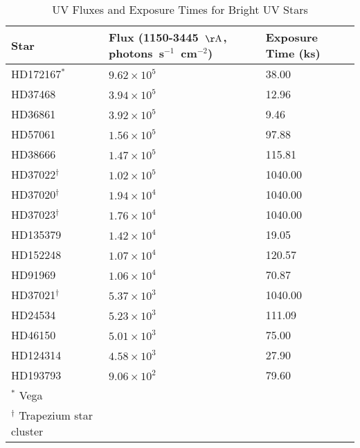 \begin{table*}
\caption{UV Fluxes and Exposure Times for Bright UV Stars\label{tab:star_fluxes}}
\begin{center}
\begin{tabular}{lll}
\hline
\hline
Star & Flux (1150-3445~${\rm \AA}$, photons~s$^{-1}$~cm$^{-2}$) & Exposure Time (ks) \\
\hline
HD172167$^*$ & $9.62 \times 10^5$ & 38.00 \\
HD37468 & $3.94 \times 10^5$ & 12.96 \\
HD36861 & $3.92 \times 10^5$ & 9.46 \\
HD57061 & $1.56 \times 10^5$ & 97.88 \\
HD38666 & $1.47 \times 10^5$ & 115.81 \\
HD37022$^\dagger$ & $1.02 \times 10^5$ & 1040.00 \\
HD37020$^\dagger$ & $1.94 \times 10^4$ & 1040.00 \\
HD37023$^\dagger$ & $1.76 \times 10^4$ & 1040.00 \\
HD135379 & $1.42 \times 10^4$ & 19.05 \\
HD152248 & $1.07 \times 10^4$ & 120.57 \\
HD91969 & $1.06 \times 10^4$ & 70.87 \\
HD37021$^\dagger$ & $5.37 \times 10^3$ & 1040.00 \\
HD24534 & $5.23 \times 10^3$ & 111.09 \\
HD46150 & $5.01 \times 10^3$ & 75.00 \\
HD124314 & $4.58 \times 10^3$ & 27.90 \\
HD193793 & $9.06 \times 10^2$ & 79.60 \\
\hline
{$^*$ Vega} \\
{$^{\dagger}$ Trapezium star cluster}
\end{tabular}
\end{center}
\end{table*}
